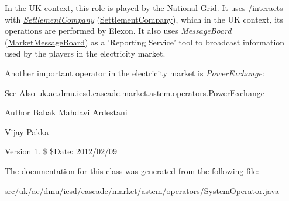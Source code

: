 In the U\-K context, this role is played by the {\ttfamily National Grid}. It uses /interacts with {\itshape \hyperlink{classuk_1_1ac_1_1dmu_1_1iesd_1_1cascade_1_1market_1_1astem_1_1operators_1_1_settlement_company}{Settlement\-Company}} (\hyperlink{classuk_1_1ac_1_1dmu_1_1iesd_1_1cascade_1_1market_1_1astem_1_1operators_1_1_settlement_company}{Settlement\-Company}), which in the U\-K context, its operations are performed by {\ttfamily Elexon}. It also uses {\itshape Message\-Board} (\hyperlink{classuk_1_1ac_1_1dmu_1_1iesd_1_1cascade_1_1market_1_1astem_1_1operators_1_1_market_message_board}{Market\-Message\-Board}) as a 'Reporting Service' tool to broadcast information used by the players in the electricity market.

Another important operator in the electricity market is {\itshape \hyperlink{classuk_1_1ac_1_1dmu_1_1iesd_1_1cascade_1_1market_1_1astem_1_1operators_1_1_power_exchange}{Power\-Exchange}}\-: \begin{DoxySeeAlso}{See Also}
\hyperlink{classuk_1_1ac_1_1dmu_1_1iesd_1_1cascade_1_1market_1_1astem_1_1operators_1_1_power_exchange}{uk.\-ac.\-dmu.\-iesd.\-cascade.\-market.\-astem.\-operators.\-Power\-Exchange}
\end{DoxySeeAlso}
\begin{DoxyAuthor}{Author}
Babak Mahdavi Ardestani 

Vijay Pakka 
\end{DoxyAuthor}
\begin{DoxyVersion}{Version}
1. \$ \$\-Date\-: 2012/02/09 
\end{DoxyVersion}


The documentation for this class was generated from the following file\-:\begin{DoxyCompactItemize}
\item 
src/uk/ac/dmu/iesd/cascade/market/astem/operators/System\-Operator.\-java\end{DoxyCompactItemize}

